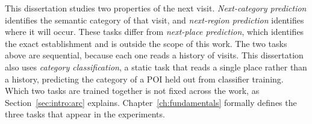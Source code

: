 %

This dissertation studies two properties of the next visit. \emph{Next-category
prediction} identifies the semantic category of that visit, and \emph{next-region
prediction} identifies where it will occur. These tasks differ from \emph{next-place
prediction}, which identifies the exact establishment and is outside the scope of
this work. The two tasks above are sequential, because each one reads a history of
visits. This dissertation also uses \emph{category classification}, a static task
that reads a single place rather than a history, predicting the category of a POI held
out from classifier training. Which two tasks are trained together is not fixed
across the work, as Section~\ref{sec:intro:arc} explains.
Chapter~\ref{ch:fundamentals} formally defines the three tasks that appear in the
experiments.

